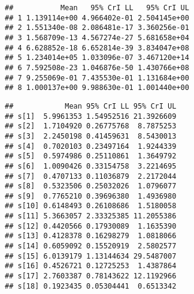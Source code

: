 \documentclass[]{article}
\newenvironment{Shaded}{\begin{snugshade}}{\end{snugshade}}
\newcommand{\CommentTok}[1]{\textcolor[rgb]{0.56,0.35,0.01}{\textit{#1}}}
\newcommand{\ControlFlowTok}[1]{\textcolor[rgb]{0.13,0.29,0.53}{\textbf{#1}}}
\newcommand{\DataTypeTok}[1]{\textcolor[rgb]{0.13,0.29,0.53}{#1}}
\newcommand{\DecValTok}[1]{\textcolor[rgb]{0.00,0.00,0.81}{#1}}
\newcommand{\FloatTok}[1]{\textcolor[rgb]{0.00,0.00,0.81}{#1}}
\newcommand{\KeywordTok}[1]{\textcolor[rgb]{0.13,0.29,0.53}{\textbf{#1}}}
\newcommand{\NormalTok}[1]{#1}
\newcommand{\OperatorTok}[1]{\textcolor[rgb]{0.81,0.36,0.00}{\textbf{#1}}}
\newcommand{\StringTok}[1]{\textcolor[rgb]{0.31,0.60,0.02}{#1}}
\begin{document}
\begin{verbatim}
##           Mean   95% CrI LL   95% CrI UL
## 1 1.139114e+00 4.966402e-01 2.504145e+00
## 2 1.551340e-08 2.086481e-17 3.360256e-01
## 3 1.568709e-13 4.567274e-27 5.681658e+04
## 4 6.628852e-18 6.652814e-39 3.834047e+08
## 5 1.234014e+05 1.033096e-07 3.467120e+14
## 6 7.592508e-23 1.046876e-50 1.430766e+08
## 7 9.255069e-01 7.435530e-01 1.131684e+00
## 8 1.000137e+00 9.988630e-01 1.001440e+00
\end{verbatim}

\begin{Shaded}
\end{Shaded}

\begin{verbatim}
##            Mean 95% CrI LL 95% CrI UL
## s[1]  5.9961353 1.54952516 21.3926609
## s[2]  1.7104920 0.26775768  8.7875253
## s[3]  2.2450198 0.41459631  8.5430013
## s[4]  0.7020103 0.23497164  1.9244339
## s[5]  0.5974986 0.25110861  1.3649792
## s[6]  1.0090426 0.33154758  3.2214695
## s[7]  0.4707133 0.11036879  2.2172044
## s[8]  0.5323506 0.25032026  1.0796077
## s[9]  0.7765210 0.39696380  1.4936980
## s[10] 0.6148493 0.26108686  1.5180058
## s[11] 5.3663057 2.33325385 11.2055386
## s[12] 0.4420566 0.17930089  1.1635390
## s[13] 0.4128378 0.16298279  1.0818066
## s[14] 0.6059092 0.15520919  2.5802577
## s[15] 6.0139179 1.13144634 29.5487007
## s[16] 0.4526721 0.12725253  1.4387864
## s[17] 2.7603387 0.78143622 12.1192966
## s[18] 0.1923435 0.05304441  0.6513342
\end{verbatim}
\end{document}
